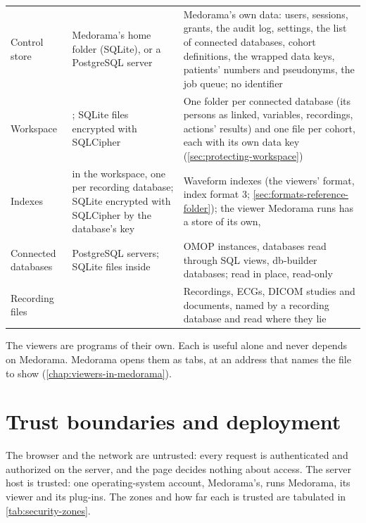 \begin{xltabular}{\linewidth}{@{}P{3.0cm}P{2.9cm}L@{}}
Control store & Medorama's home folder (SQLite), or a PostgreSQL server & Medorama's own data:
  users, sessions, grants, the audit log, settings, the list of connected databases, cohort
  definitions, the wrapped data keys, patients' numbers and pseudonyms, the job queue; no
  identifier \\
Workspace & ; SQLite files encrypted with SQLCipher & One folder per
  connected database (its persons as linked, variables, recordings, actions' results) and one
  file per cohort, each with its own data key (\cref{sec:protecting-workspace}) \\
Indexes &  in the workspace, one per recording database; SQLite
  encrypted with SQLCipher by the database's key & Waveform indexes (the viewers' format, index
  format 3; \cref{sec:formats-reference-folder}); the viewer Medorama runs has a store of its
  own,  \\
Connected databases & PostgreSQL servers; SQLite files inside  & OMOP
  instances, databases read through SQL views, db-builder databases; read in place, read-only \\
Recording files &  & Recordings, ECGs, DICOM studies and documents, named by a
  recording database and read where they lie \\
\end{xltabular}

The viewers are programs of their own. Each is useful alone and never depends on Medorama.
Medorama opens them as tabs, at an address that names the file to show
(\cref{chap:viewers-in-medorama}).

\section{Trust boundaries and deployment}
\label{sec:architecture-boundaries}


The browser and the network are untrusted: every request is authenticated and authorized on the
server, and the page decides nothing about access. The server host is trusted: one
operating-system account, Medorama's, runs Medorama, its viewer and its plug-ins. The
zones and how far each is trusted are tabulated in \cref{tab:security-zones}.

